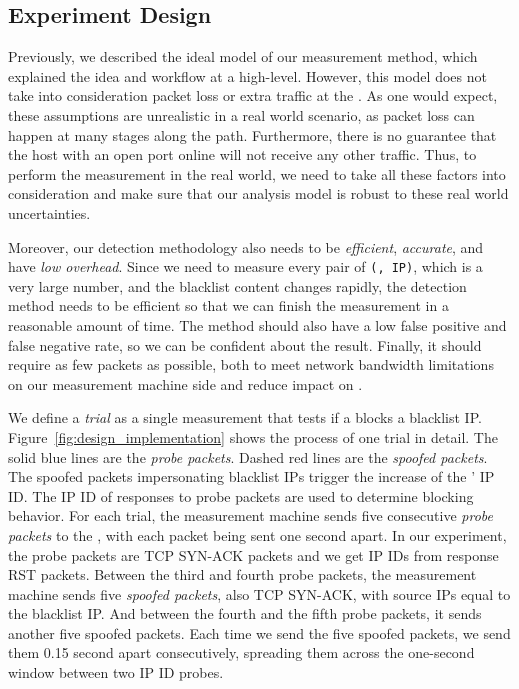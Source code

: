 
\subsection{Experiment Design}
\label{sec:methtrain}
Previously, we described the ideal model of our measurement method,
which explained the idea and workflow at a high-level. However, this model
does not take into consideration packet loss or extra traffic at the
{}. As one would expect, these assumptions are unrealistic in a real
world scenario, as packet loss can happen at many stages along the path.
Furthermore, there is no guarantee that the host with an open port online
will not receive any other traffic. Thus, to perform the measurement in the real
world, we need to take all these factors into consideration and make sure
that our analysis model is robust to these real world uncertainties.

Moreover, our detection methodology also needs to be \textit{efficient},
\textit{accurate}, and have \textit{low overhead}. Since we need to
measure every pair of \texttt{({}, IP)}, which is a
very large number, and the blacklist content changes rapidly, the detection
method needs to be efficient so that we can finish the measurement in a
reasonable amount of time. The method should also have a low false positive
and false negative rate, so we can be confident about the result. Finally, it
should require as few packets as possible, both to meet network bandwidth
limitations on our measurement machine side and reduce impact on
{}.

We define a \textit{trial} as a single measurement that tests if a
{} blocks a blacklist IP. Figure~\ref{fig:design_implementation}
shows the process of one trial in detail. 
The solid blue lines are the \textit{probe
packets}. Dashed red lines are the \textit{spoofed packets}. The spoofed
packets impersonating blacklist IPs trigger the increase of the
{}' IP ID. The IP ID of responses to probe packets are used to
determine blocking behavior.
For each trial, the measurement
machine sends five consecutive \textit{probe packets} to the {},
with each packet being sent one second apart. In our experiment, the probe
packets are TCP SYN-ACK packets and we get IP IDs from response RST packets.
Between the third and fourth probe packets, the measurement machine sends
five \textit{spoofed packets}, also TCP SYN-ACK, with source IPs equal to the
blacklist IP. And between the fourth and the fifth probe packets, it sends
another five spoofed packets. Each time we send the five spoofed packets, we
send them 0.15 second apart consecutively, spreading them across the one-second
window between two IP ID probes.

